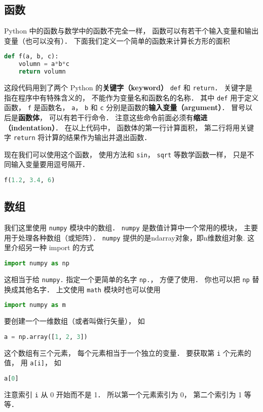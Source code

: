 \subsection{函数}
Python 中的函数与数学中的函数不完全一样， 函数可以有若干个输入变量和输出变量（也可以没有）． 下面我们定义一个简单的函数来计算长方形的面积
\begin{lstlisting}[language=python]
def f(a, b, c):
    volumn = a*b*c
    return volumn
\end{lstlisting}
这段代码用到了两个 Python 的\textbf{关键字（keyword）} \verb|def| 和 \verb|return|． 关键字是指在程序中有特殊含义的， 不能作为变量名和函数名的名称． 其中 \verb|def| 用于定义函数， \verb|f| 是函数名， \verb|a|， \verb|b| 和 \verb|c| 分别是函数的\textbf{输入变量（argument）}． 冒号以后是\textbf{函数体}， 可以有若干行命令． 注意这些命令前面必须有\textbf{缩进（indentation）}．  在以上代码中， 函数体的第一行计算面积， 第二行将用关键字 \verb|return| 将计算的结果作为输出并退出函数．

现在我们可以使用这个函数， 使用方法和 \verb|sin|， \verb|sqrt| 等数学函数一样， 只是不同输入变量要用逗号隔开．
\begin{lstlisting}[language=python]
f(1.2, 3.4, 6)
\end{lstlisting}

\subsection{数组}
我们这里使用 \verb|numpy| 模块中的数组． \verb|numpy| 是数值计算中一个常用的模块， 主要用于处理各种数组（或矩阵）． \verb|numpy| 提供的是ndarray对象，即n维数组对象. 这里介绍另一种 import 的方式
\begin{lstlisting}[language=python]
import numpy as np
\end{lstlisting}
这相当于给 \verb|numpy.| 指定一个更简单的名字 \verb|np.|， 方便了使用． 你也可以把 \verb|np| 替换成其他名字． 上文使用 \verb|math| 模块时也可以使用
\begin{lstlisting}[language=python]
import numpy as m
\end{lstlisting}

要创建一个一维数组（或者叫做行矢量）， 如
\begin{lstlisting}[language=python]
a = np.array([1, 2, 3])
\end{lstlisting}
这个数组有三个元素， 每个元素相当于一个独立的变量． 要获取第 \verb|i| 个元素的值， 用 \verb|a[i]|， 如
\begin{lstlisting}[language=python]
a[0]
\end{lstlisting}
注意索引 \verb|i| 从 0 开始而不是 1． 所以第一个元素索引为 0， 第二个索引为 1 等等．

